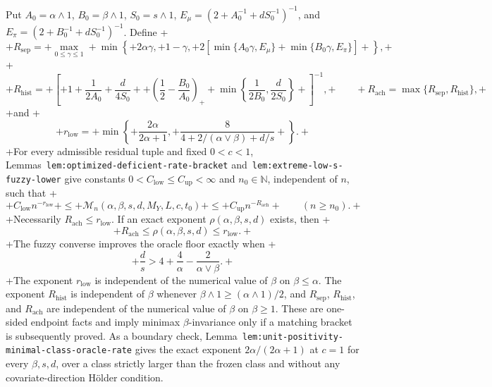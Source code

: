 Put \(A_0=\alpha\wedge1\), \(B_0=\beta\wedge1\), \(S_0=s\wedge1\), \(E_\mu=(2+A_0^{-1}+dS_0^{-1})^{-1}\), and \(E_\pi=(2+B_0^{-1}+dS_0^{-1})^{-1}\). Define
+\[
+R_{\mathrm{sep}}=
+\max_{0\le\gamma\le1}
+\min\left\{
+2\alpha\gamma,
+1-\gamma,
+2\left[\min\{A_0\gamma,E_\mu\}+\min\{B_0\gamma,E_\pi\}\right]
+\right\},
+\]
+\[
+R_{\mathrm{hist}}=
+\left[
+1+\frac1{2A_0}+\frac d{4S_0}
++\left(\frac12-\frac{B_0}{A_0}\right)_+
+\min\left\{\frac1{2B_0},\frac d{2S_0}\right\}
+\right]^{-1},
+\qquad
+R_{\mathrm{ach}}=\max\{R_{\mathrm{sep}},R_{\mathrm{hist}}\},
+\]
+and
+\[
+r_{\mathrm{low}}=
+\min\left\{
+\frac{2\alpha}{2\alpha+1},
+\frac{8}{4+2/(\alpha\vee\beta)+d/s}
+\right\}.
+\]
+For every admissible residual tuple and fixed \(0<c<1\), Lemmas~\texttt{lem:optimized-deficient-rate-bracket} and~\texttt{lem:extreme-low-s-fuzzy-lower} give constants \(0<C_{\mathrm{low}}\le C_{\mathrm{up}}<\infty\) and \(n_0\in\mathbb N\), independent of \(n\), such that
+\[
+C_{\mathrm{low}}n^{-r_{\mathrm{low}}}
+\le
+\mathcal M_n(\alpha,\beta,s,d,M_Y,L,c,t_0)
+\le
+C_{\mathrm{up}}n^{-R_{\mathrm{ach}}}
+\qquad(n\ge n_0).
+\]
+Necessarily \(R_{\mathrm{ach}}\le r_{\mathrm{low}}\). If an exact exponent \(\rho(\alpha,\beta,s,d)\) exists, then
+\[
+R_{\mathrm{ach}}\le\rho(\alpha,\beta,s,d)\le r_{\mathrm{low}}.
+\]
+The fuzzy converse improves the oracle floor exactly when
+\[
+\frac ds>4+\frac4\alpha-\frac{2}{\alpha\vee\beta}.
+\]
+The exponent \(r_{\mathrm{low}}\) is independent of the numerical value of \(\beta\) on \(\beta\le\alpha\). The exponent \(R_{\mathrm{hist}}\) is independent of \(\beta\) whenever \(\beta\wedge1\ge(\alpha\wedge1)/2\), and \(R_{\mathrm{sep}}\), \(R_{\mathrm{hist}}\), and \(R_{\mathrm{ach}}\) are independent of the numerical value of \(\beta\) on \(\beta\ge1\). These are one-sided endpoint facts and imply minimax \(\beta\)-invariance only if a matching bracket is subsequently proved. As a boundary check, Lemma~\texttt{lem:unit-positivity-minimal-class-oracle-rate} gives the exact exponent \(2\alpha/(2\alpha+1)\) at \(c=1\) for every \(\beta,s,d\), over a class strictly larger than the frozen class and without any covariate-direction H\"older condition.